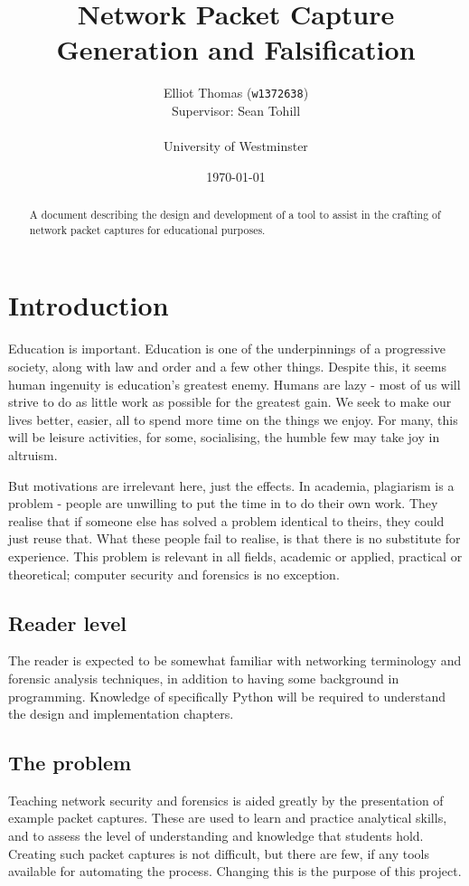 \documentclass[10pt,a4paper,notitlepage,twoside]{report}
\author{Elliot Thomas (\texttt{w1372638})\\ \small Supervisor: Sean Tohill\\ \\ University of Westminster}
\title{Network Packet Capture Generation and Falsification}
\date{\today}
\begin{document}
\maketitle
\begin{abstract}
\begin{center}
A document describing the design and development of a tool to assist in the crafting of network packet captures for educational purposes.
\end{center}
\end{abstract}
\pagebreak
\listoffigures
\lstlistoflistings
\tableofcontents

\chapter{Introduction}
Education is important. Education is one of the underpinnings of a progressive society, along with law and order and a few other things.
Despite this, it seems human ingenuity is education's greatest enemy. Humans are lazy - most of us will strive to do as little work as possible for the greatest gain.
We seek to make our lives better, easier, all to spend more time on the things we enjoy. For many, this will be leisure activities, for some, socialising, the humble few may take joy in altruism.

But motivations are irrelevant here, just the effects.
In academia, plagiarism is a problem - people are unwilling to put the time in to do their own work. They realise that if someone else has solved a problem identical to theirs, they could just reuse that.
What these people fail to realise, is that there is no substitute for experience. This problem is relevant in all fields, academic or applied, practical or theoretical; computer security and forensics is no exception.

\section{Reader level}
The reader is expected to be somewhat familiar with networking terminology and forensic analysis techniques, in addition to having some background in programming. Knowledge of specifically Python will be required to understand the design and implementation chapters.

\section{The problem}
Teaching network security and forensics is aided greatly by the presentation of example packet captures. These are used to learn and practice analytical skills, and to assess the level of understanding and knowledge that students hold.
Creating such packet captures is not difficult, but there are few, if any tools available for automating the process. Changing this is the purpose of this project.
\end{document}
